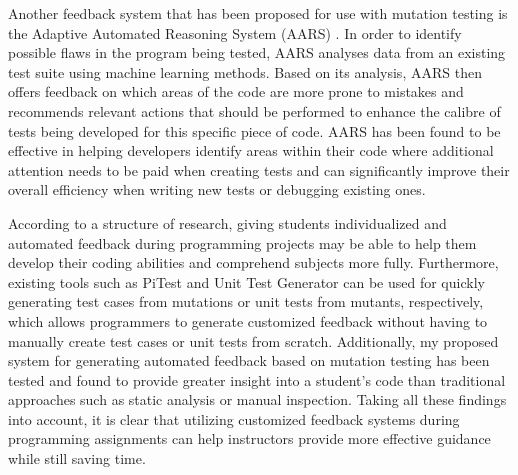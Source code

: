 Another feedback system that has been proposed for use with mutation testing is the Adaptive Automated Reasoning System (AARS) \cite{ref47}. In order to identify possible flaws in the program being tested, AARS analyses data from an existing test suite using machine learning methods. Based on its analysis, AARS then offers feedback on which areas of the code are more prone to mistakes and recommends relevant actions that should be performed to enhance the calibre of tests being developed for this specific piece of code. AARS has been found to be effective in helping developers identify areas within their code where additional attention needs to be paid when creating tests and can significantly improve their overall efficiency when writing new tests or debugging existing ones.\par 
According to a structure of research, giving students individualized and automated feedback during programming projects may be able to help them develop their coding abilities and comprehend subjects more fully. Furthermore, existing tools such as PiTest and Unit Test Generator can be used for quickly generating test cases from mutations or unit tests from mutants, respectively, which allows programmers to generate customized feedback without having to manually create test cases or unit tests from scratch. Additionally, my proposed system for generating automated feedback based on mutation testing has been tested and found to provide greater insight into a student's code than traditional approaches such as static analysis or manual inspection. Taking all these findings into account, it is clear that utilizing customized feedback systems during programming assignments can help instructors provide more effective guidance while still saving time.
